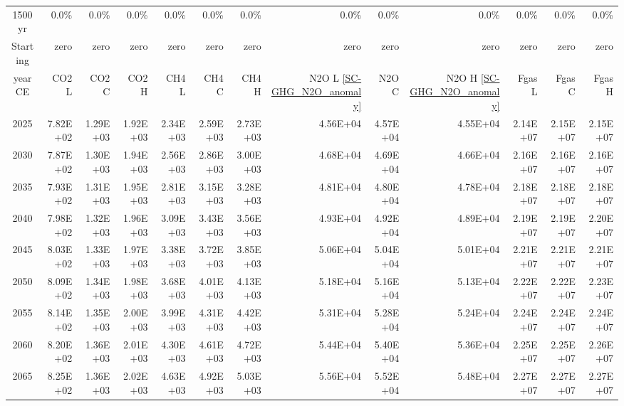 \documentclass{article}
\begin{document}
\begin{table}
\begin{tabular}{crrr|rrr|rrr|rrr}
         &            &            &            &            &            &            &            &            &            &            &            &            \\ \hline
1500 yr  & 0.0\%      & 0.0\%      & 0.0\%      & 0.0\%      & 0.0\%      & 0.0\%      & 0.0\%      & 0.0\%      & 0.0\%      & 0.0\%      & 0.0\%      & 0.0\%      \\
Starting & zero       & zero       & zero       & zero       & zero       & zero       & zero       & zero       & zero       & zero       & zero       & zero       \\
year CE  & CO2 L      & CO2 C      & CO2 H      & CH4 L      & CH4 C      & CH4 H      & N2O L \ref{SC-GHG_N2O_anomaly}     & N2O C      & N2O H \ref{SC-GHG_N2O_anomaly}      & Fgas L     & Fgas C     & Fgas H     \\
2025     & 7.82E+02   & 1.29E+03   & 1.92E+03   & 2.34E+03   & 2.59E+03   & 2.73E+03   & 4.56E+04   & 4.57E+04   & 4.55E+04   & 2.14E+07   & 2.15E+07   & 2.15E+07   \\
2030     & 7.87E+02   & 1.30E+03   & 1.94E+03   & 2.56E+03   & 2.86E+03   & 3.00E+03   & 4.68E+04   & 4.69E+04   & 4.66E+04   & 2.16E+07   & 2.16E+07   & 2.16E+07   \\
2035     & 7.93E+02   & 1.31E+03   & 1.95E+03   & 2.81E+03   & 3.15E+03   & 3.28E+03   & 4.81E+04   & 4.80E+04   & 4.78E+04   & 2.18E+07   & 2.18E+07   & 2.18E+07   \\
2040     & 7.98E+02   & 1.32E+03   & 1.96E+03   & 3.09E+03   & 3.43E+03   & 3.56E+03   & 4.93E+04   & 4.92E+04   & 4.89E+04   & 2.19E+07   & 2.19E+07   & 2.20E+07   \\
2045     & 8.03E+02   & 1.33E+03   & 1.97E+03   & 3.38E+03   & 3.72E+03   & 3.85E+03   & 5.06E+04   & 5.04E+04   & 5.01E+04   & 2.21E+07   & 2.21E+07   & 2.21E+07   \\
2050     & 8.09E+02   & 1.34E+03   & 1.98E+03   & 3.68E+03   & 4.01E+03   & 4.13E+03   & 5.18E+04   & 5.16E+04   & 5.13E+04   & 2.22E+07   & 2.22E+07   & 2.23E+07   \\
2055     & 8.14E+02   & 1.35E+03   & 2.00E+03   & 3.99E+03   & 4.31E+03   & 4.42E+03   & 5.31E+04   & 5.28E+04   & 5.24E+04   & 2.24E+07   & 2.24E+07   & 2.24E+07   \\
2060     & 8.20E+02   & 1.36E+03   & 2.01E+03   & 4.30E+03   & 4.61E+03   & 4.72E+03   & 5.44E+04   & 5.40E+04   & 5.36E+04   & 2.25E+07   & 2.25E+07   & 2.26E+07   \\
2065     & 8.25E+02   & 1.36E+03   & 2.02E+03   & 4.63E+03   & 4.92E+03   & 5.03E+03   & 5.56E+04   & 5.52E+04   & 5.48E+04   & 2.27E+07   & 2.27E+07   & 2.27E+07   \\

\end{tabular}
\end{table}
\end{document}
